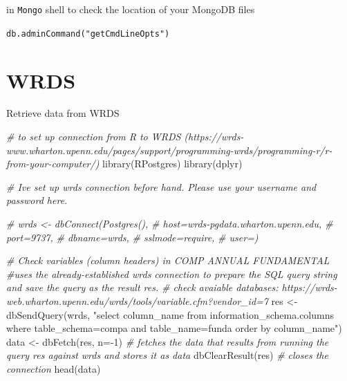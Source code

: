 \documentclass[
]{book}
\newenvironment{Shaded}{\begin{snugshade}}{\end{snugshade}}
\newcommand{\AttributeTok}[1]{\textcolor[rgb]{0.77,0.63,0.00}{#1}}
\newcommand{\CommentTok}[1]{\textcolor[rgb]{0.56,0.35,0.01}{\textit{#1}}}
\newcommand{\DecValTok}[1]{\textcolor[rgb]{0.00,0.00,0.81}{#1}}
\newcommand{\FunctionTok}[1]{\textcolor[rgb]{0.00,0.00,0.00}{#1}}
\newcommand{\NormalTok}[1]{#1}
\newcommand{\OtherTok}[1]{\textcolor[rgb]{0.56,0.35,0.01}{#1}}
\newcommand{\SpecialCharTok}[1]{\textcolor[rgb]{0.00,0.00,0.00}{#1}}
\newcommand{\StringTok}[1]{\textcolor[rgb]{0.31,0.60,0.02}{#1}}
\begin{document}
in \texttt{Mongo} shell to check the location of your MongoDB files

\texttt{db.adminCommand("getCmdLineOpts")}

\hypertarget{wrds}{%
\section{WRDS}\label{wrds}}

Retrieve data from WRDS

\begin{Shaded}
\begin{Highlighting}[]
\CommentTok{\# to set up connection from R to WRDS (https://wrds{-}www.wharton.upenn.edu/pages/support/programming{-}wrds/programming{-}r/r{-}from{-}your{-}computer/)}
\FunctionTok{library}\NormalTok{(RPostgres)}
\FunctionTok{library}\NormalTok{(dplyr)}

\CommentTok{\# I\textquotesingle{}ve set up wrds connection before hand. Please use your username and password here.}

\CommentTok{\# wrds \textless{}{-} dbConnect(Postgres(),}
\CommentTok{\#                   host=\textquotesingle{}wrds{-}pgdata.wharton.upenn.edu\textquotesingle{},}
\CommentTok{\#                   port=9737,}
\CommentTok{\#                   dbname=\textquotesingle{}wrds\textquotesingle{},}
\CommentTok{\#                   sslmode=\textquotesingle{}require\textquotesingle{},}
\CommentTok{\#                   user=\textquotesingle{}\textquotesingle{})}

\CommentTok{\# Check variables (column headers) in COMP ANNUAL FUNDAMENTAL}
\CommentTok{\#uses the already{-}established wrds connection to prepare the SQL query string and save the query as the result res.}
\CommentTok{\# check avaiable databases: https://wrds{-}web.wharton.upenn.edu/wrds/tools/variable.cfm?vendor\_id=7}
\NormalTok{res }\OtherTok{\textless{}{-}} \FunctionTok{dbSendQuery}\NormalTok{(wrds, }\StringTok{"select column\_name}
\StringTok{                   from information\_schema.columns}
\StringTok{                   where table\_schema=\textquotesingle{}compa\textquotesingle{}}
\StringTok{                   and table\_name=\textquotesingle{}funda\textquotesingle{}}
\StringTok{                   order by column\_name"}\NormalTok{)}
\NormalTok{data }\OtherTok{\textless{}{-}} \FunctionTok{dbFetch}\NormalTok{(res, }\AttributeTok{n=}\SpecialCharTok{{-}}\DecValTok{1}\NormalTok{) }\CommentTok{\# fetches the data that results from running the query res against wrds and stores it as data}
\FunctionTok{dbClearResult}\NormalTok{(res) }\CommentTok{\# closes the connection}
\FunctionTok{head}\NormalTok{(data)}
\end{Highlighting}
\end{Shaded}
\end{document}
